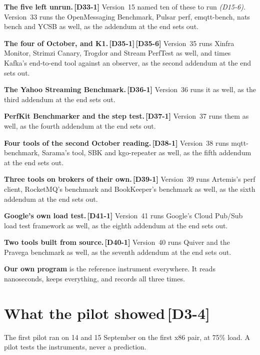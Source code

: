 \documentclass[11pt]{article}
\newcommand{\gl}[1]{{\color{soft}\itshape\small (#1)}}
\newcommand{\chgold}[1]{\,{\color{oldcol}\bfseries\footnotesize[#1]}}
\begin{document}
\textbf{The five left unrun.}\chgold{D33-1} Version~15 named ten of these to run \gl{D15-6}. Version~33 runs the OpenMessaging Benchmark, Pulsar perf, emqtt-bench, nats bench and YCSB as well, as the addendum at the end sets out.

\textbf{The four of October, and K1.}\chgold{D35-1}\chgold{D35-6} Version~35 runs Xinfra Monitor, Strimzi Canary, Trogdor and Stream PerfTest as well, and times Kafka's end-to-end tool against an observer, as the second addendum at the end sets out.

\textbf{The Yahoo Streaming Benchmark.}\chgold{D36-1} Version~36 runs it as well, as the third addendum at the end sets out.

\textbf{PerfKit Benchmarker and the step test.}\chgold{D37-1} Version~37 runs them as well, as the fourth addendum at the end sets out.

\textbf{Four tools of the second October reading.}\chgold{D38-1} Version~38 runs mqtt-benchmark, Sarama's tool, SBK and kgo-repeater as well, as the fifth addendum at the end sets out.

\textbf{Three tools on brokers of their own.}\chgold{D39-1} Version~39 runs Artemis's perf client, RocketMQ's benchmark and BookKeeper's benchmark as well, as the sixth addendum at the end sets out.

\textbf{Google's own load test.}\chgold{D41-1} Version~41 runs Google's Cloud Pub/Sub load test framework as well, as the eighth addendum at the end sets out.

\textbf{Two tools built from source.}\chgold{D40-1} Version~40 runs Quiver and the Pravega benchmark as well, as the seventh addendum at the end sets out.

\textbf{Our own program} is the reference instrument everywhere. It reads nanoseconds, keeps everything, and records all three times.

\section[What the pilot showed]{What the pilot showed\protect\chgold{D3-4}}\label{sec:pilot}
The first pilot ran on 14 and 15 September on the first x86 pair, at 75\% load. A pilot tests the instruments, never a prediction.
\end{document}
